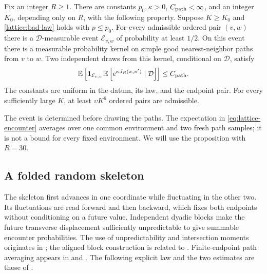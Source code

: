 \begin{proposition}\label{prop:good-paths}
Fix an integer $R\ge1$.  There are constants
$p_0,\kappa>0$, $C_{\rm path}<\infty$, and an integer $K_0$, depending
only on $R$, with the following property.  Suppose $K\ge K_0$ and
\eqref{lattice:bad-law} holds with $p\le p_0$.  For every admissible ordered
pair $(v,w)$ there is a $\mathcal D$-measurable event $\mathcal E_{v,w}$
of probability at least $1/2$.  On this event there is a measurable
probability kernel on simple good nearest-neighbor paths from $v$ to $w$.
Two independent draws from this kernel, conditional on $\mathcal D$,
satisfy
\begin{equation}\label{eq:lattice-encounter}
 \mathbb E\left[
   \mathbf 1_{\mathcal E_{v,w}}
   \mathbb E\left[e^{\kappa J_R(\pi,\pi')}\mid\mathcal D\right]
       \right]\le C_{\rm path}.
\end{equation}
The constants are uniform in the datum, its law, and the endpoint pair.
For every sufficiently large $K$, at least $\upsilon K^6$ ordered pairs
are admissible.
\end{proposition}

The event is determined before drawing the paths.  The expectation in
\eqref{eq:lattice-encounter} averages over one common environment and two fresh
path samples; it is not a bound for every fixed environment.  We will
use the proposition with $R=30$.

\subsection{A folded random skeleton}\label{lattice:skeleton-law}

The skeleton first advances in one coordinate while fluctuating in the
other two.  Its fluctuations are read forward and then backward, which
fixes both endpoints without conditioning on a future value.  Independent
dyadic blocks make the future transverse displacement sufficiently
unpredictable to give summable encounter probabilities.  The use of
unpredictability and intersection moments originates in
\citet[Theorem~1.3 and Lemma~3.1]{BPP1998}; the aligned
block construction is related to
\citet[Section~3, Proposition~3.1]{HaggstromMossel1998}.  Finite-endpoint
path averaging appears in \citet[Section~6, Lemma~6.1]{AbbeMassoulieMontanariSlySrivastava2018}
and \citet[Section~2, Lemma~2.5]{GarbanSpencer2023}.  The following explicit
law and the two estimates are those of \citet[Section~8.1]{B}.

